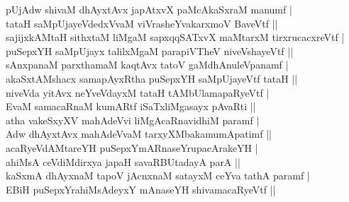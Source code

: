 \begin{entry}
\begin{shl}
pUjAdw shivaM dhAyxtAvx japAtxvX paMcAkaSxraM manumf |\\
tataH saMpUjayeVdedxVvaM viVrasheYvakarxmoV BaveVtf ||\\
sajijxkAMtaH sithxtaM liMgaM sapxqqSATxvX maMtarxM tirxrucacxreVtf |\\
puSepxYH saMpUjayx talilxMgaM parapiVTheV niveVshayeVtf ||\\
sAnxpanaM parxthamaM kaqtAvx tatoV gaMdhAnuleVpanamf |\\
akaSxtAMshacx samapAyxRtha puSepxYH saMpUjayeVtf tataH ||\\
niveVda yitAvx neYveVdayxM tataH tAMbUlamapaRyeVtf |\\
EvaM samacaRnaM kumARtf iSaTxliMgasayx pAvaRti ||\\
atha vakeSxyXV mahAdeVvi liMgAcaRnavidhiM paramf |\\
Adw dhAyxtAvx mahAdeVvaM tarxyXMbakamumApatimf ||\\
acaRyeVdAMtareYH puSepxYmARnaseYrupacArakeYH |\\
ahiMsA ceVdiMdirxya japaH savaRBUtadayA parA ||\\
kaSxmA dhAyxnaM tapoV jAcnxnaM satayxM ceYva tathA paramf |\\
EBiH puSepxYrahiMsAdeyxY mAnaseYH shivamacaRyeVtf ||
\end{shl}
\end{entry}

